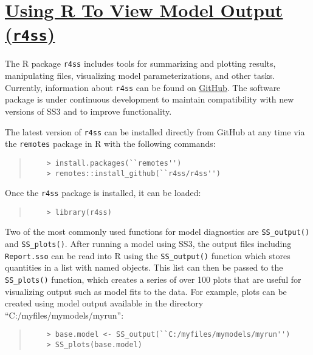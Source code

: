 \section[Using R To View Model Output (\texttt{r4ss})]{\protect\hyperref[sec:r4ss]{Using R To View Model Output (\texttt{r4ss})}}\label{sec:r4ss}

The R package \texttt{r4ss} includes tools for summarizing and plotting results, manipulating files, visualizing model parameterizations, and other tasks. Currently, information about \texttt{r4ss} can be found on \href{https://github.com/r4ss/r4ss}{GitHub}.  The software package is under continuous development to maintain compatibility with new versions of SS3 and to improve functionality.

The latest version of \texttt{r4ss} can be installed directly from GitHub at any time via the \texttt{remotes} package in R with the following commands:

\begin{quote}
	\begin{verbatim}
	> install.packages(``remotes'')
	> remotes::install_github(``r4ss/r4ss'')
	\end{verbatim}
\end{quote}

Once the \texttt{r4ss} package is installed, it can be loaded:

\begin{quote}
	\begin{verbatim}
	> library(r4ss)
	\end{verbatim}
\end{quote}

Two of the most commonly used functions for model diagnostics are \texttt{SS\_output()} and \texttt{SS\_plots()}. After running a model using SS3, the output files including \texttt{Report.sso} can be read into R using the \texttt{SS\_output()} function which stores quantities in a list with named objects. This list can then be passed to the \texttt{SS\_plots()} function, which creates a series of over 100 plots that are useful for visualizing output such as model fits to the data. For example, plots can be created using model output available in the directory ``C:/myfiles/mymodels/myrun'':

\begin{quote}
	\begin{verbatim}
	> base.model <- SS_output(``C:/myfiles/mymodels/myrun'')
	> SS_plots(base.model)
	\end{verbatim}
\end{quote}
  
